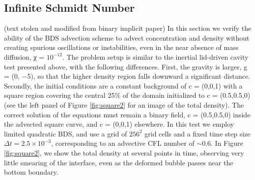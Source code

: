 \documentclass[final]{siamltex}
\begin{document}
\subsection{Infinite Schmidt Number}
(text stolen and modified from binary implicit paper)
In this section we verify the ability of the BDS advection scheme to advect concentration and
density without creating spurious oscillations or instabilities, even in the near absence of mass diffusion,
χ = $10^{-12}$. The problem setup is similar to the inertial lid-driven cavity test presented above, with
the following differences. First, the gravity is larger, g = (0, −5), so that the higher density region
falls downward a significant distance. Secondly, the initial conditions are a constant background
of c = (0,0,1) with a square region covering the central 25\% of the domain initialized to c = (0.5,0.5,0) (see the
left panel of Figure \ref{fig:square2} for an image of the total density).
The correct solution of the equations must remain a binary field, c = (0.5,0.5,0)
inside the advected square curve, and c = (0,0,1) elsewhere. In this test we employ limited quadratic
BDS, and use a grid of $256^2$ grid cells and a fixed time step size $\Delta t = 2.5\times 10^{-3}$, corresponding to
an advective CFL number of $\sim 0.6$. In Figure \ref{fig:square2}, we show the total density at several points in
time, observing very little smearing of the interface, even as the deformed bubble passes near the
bottom boundary.
\end{document}

